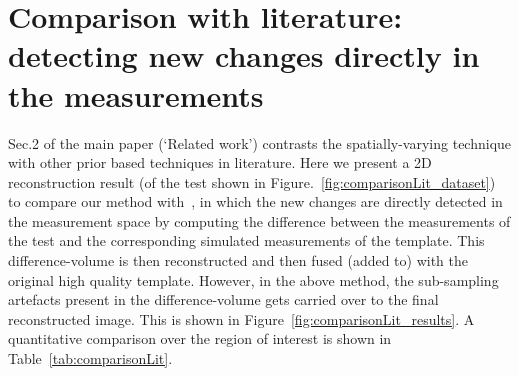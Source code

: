 \documentclass{article}
\begin{document}
\section{Comparison with literature: detecting new changes directly in the measurements}
Sec.2 of the main paper (`Related work') contrasts the spatially-varying technique  with other prior based techniques in literature. Here we present a 2D reconstruction  result (of the test shown in Figure.~\ref{fig:comparisonLit_dataset}) to compare our method with~\cite{Lee2012}, in which the new changes are directly detected in the measurement space by computing the difference between the measurements of the test and the corresponding simulated measurements of the template. This difference-volume is then reconstructed and then fused (added to) with the original high quality template. However, in the above method, the sub-sampling artefacts present in the difference-volume gets carried over to the final reconstructed image. This is shown in Figure~\ref{fig:comparisonLit_results}. A quantitative comparison over the region of interest is shown in Table~\ref{tab:comparisonLit}.
\end{document}
